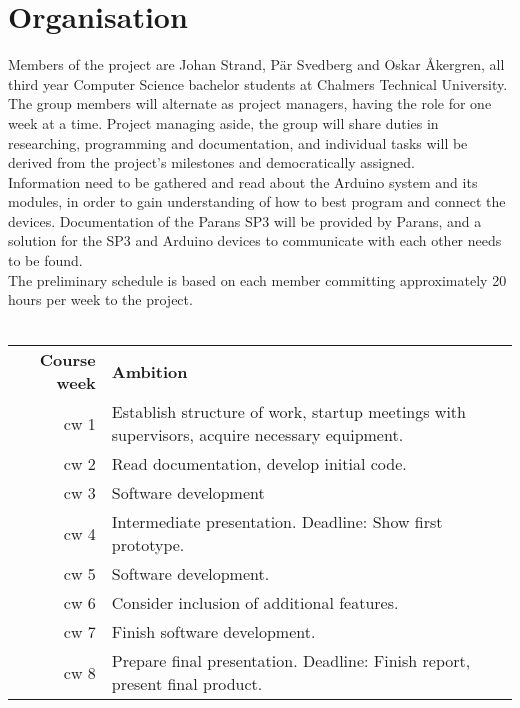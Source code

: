 \documentclass[a4paper]{article}
\begin{document}
   \section*{Organisation} %
	\label{sec:organisation}
		Members of the project are Johan Strand, Pär Svedberg and Oskar Åkergren, all third year Computer Science bachelor students at Chalmers Technical University. The group members will alternate as project managers, having the role for one week at a time. Project managing aside, the group will share duties in researching, programming and documentation, and individual tasks will be derived from the project's milestones and democratically assigned. \\

		\noindent Information need to be gathered and read about the Arduino system and its modules, in order to gain understanding of how to best program and connect the devices. Documentation of the Parans SP3 will be provided by Parans, and a solution for the SP3 and Arduino devices to communicate with each other needs to be found. \\
		
		\noindent The preliminary schedule is based on each member committing approximately 20 hours per week to the project.
		\\ \\
		\noindent\begin{tabularx}{\textwidth}{@{}rX}
			\textbf{Course week} & \textbf{Ambition}\\
			cw 1 & Establish structure of work, startup meetings with supervisors, acquire necessary equipment. \\
			cw 2 & Read documentation, develop initial code. \\
			cw 3 & Software development \\
			cw 4 & Intermediate presentation. Deadline: Show first prototype. \\
			cw 5 & Software development. \\
			cw 6 & Consider inclusion of additional features. \\
			cw 7 & Finish software development. \\
			cw 8 & Prepare final presentation. Deadline: Finish report, present final product. \\
		\end{tabularx}
\end{document}
